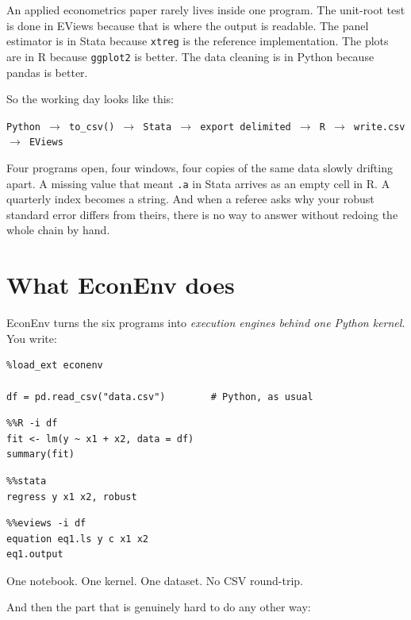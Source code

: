 \documentclass[11pt,a4paper]{report}
\begin{document}
An applied econometrics paper rarely lives inside one program. The unit-root
test is done in EViews because that is where the output is readable. The panel
estimator is in Stata because \texttt{xtreg} is the reference implementation.
The plots are in R because \texttt{ggplot2} is better. The data cleaning is in
Python because pandas is better.

So the working day looks like this:

\begin{center}
\texttt{Python $\rightarrow$ to\_csv() $\rightarrow$ Stata $\rightarrow$ export
delimited $\rightarrow$ R $\rightarrow$ write.csv $\rightarrow$ EViews}
\end{center}

Four programs open, four windows, four copies of the same data slowly drifting
apart. A missing value that meant \texttt{.a} in Stata arrives as an empty cell
in R. A quarterly index becomes a string. And when a referee asks why your
robust standard error differs from theirs, there is no way to answer without
redoing the whole chain by hand.

\section{What EconEnv does}

EconEnv turns the six programs into \emph{execution engines behind one Python
kernel}. You write:

\begin{lstlisting}
%load_ext econenv

df = pd.read_csv("data.csv")        # Python, as usual
\end{lstlisting}

\begin{lstlisting}
%%R -i df
fit <- lm(y ~ x1 + x2, data = df)
summary(fit)
\end{lstlisting}

\begin{lstlisting}
%%stata
regress y x1 x2, robust
\end{lstlisting}

\begin{lstlisting}
%%eviews -i df
equation eq1.ls y c x1 x2
eq1.output
\end{lstlisting}

One notebook. One kernel. One dataset. No CSV round-trip.

And then the part that is genuinely hard to do any other way:
\end{document}
